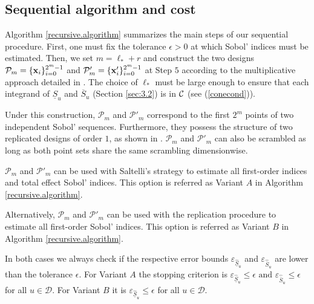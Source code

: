 \subsection{Sequential algorithm and cost}
\label{sec:4.1}

Algorithm \ref{recursive.algorithm} summarizes the main steps of our sequential procedure. First, one must fix the tolerance $\epsilon >0$ at which Sobol' indices must be estimated. Then, we set $m=\ell_*+r$ and construct the two designs $\mathcal{P}_{m}=\{\boldsymbol{\mathbf{x}}_i\}_{i=0}^{2^{m}-1}$ and $\mathcal{P}'_{m}=\{\boldsymbol{\mathbf{x}}'_i\}_{i=0}^{2^{m}-1}$ at Step $5$ according to the multiplicative approach detailed in \cite{GJAHMP}. The choice of $\ell_*$ must be large enough to ensure that each integrand of $\underline{S}_u$ and $\overline{S}_u$ (Section \ref{sec:3.2}) is in $\mathcal{C}$ (see  (\ref{conecond})).

Under this construction, $\mathcal{P}_{m}$ and $\mathcal{P}'_{m}$ correspond to the first $2^{m}$ points of two independent Sobol' sequences. Furthermore, they possess the structure of two replicated designs of order $1$, as shown in \cite{GJAHMP}. $\mathcal{P}_{m}$ and $\mathcal{P}'_{m}$ can also be scrambled as long as both point sets share the same scrambling dimensionwise.
\bigskip

$\mathcal{P}_{m}$ and $\mathcal{P}'_{m}$ can be used with Saltelli's strategy to estimate all first-order indices and total effect Sobol' indices. This option is referred as Variant $A$ in Algorithm \ref{recursive.algorithm}.

Alternatively, $\mathcal{P}_{m}$ and $\mathcal{P}'_{m}$ can be used with the replication procedure to estimate all first-order Sobol' indices. This option is referred as Variant $B$ in Algorithm \ref{recursive.algorithm}. 

In both cases we always check if the respective error bounds $\varepsilon_{\widehat{\underline{S}}_u}$ and $\varepsilon_{\widehat{\overline{S}}_u}$ are lower than the tolerance $\epsilon$. For Variant $A$ the stopping criterion is $\varepsilon_{\widehat{\underline{S}}_u} \leq \epsilon \text{ and } \varepsilon_{\widehat{\overline{S}}_u} \leq \epsilon$ for all $ u \in \mathcal{D}$. For Variant $B$ it is $\varepsilon_{\widehat{\underline{S}}_u} \leq \epsilon$ for all $ u \in \mathcal{D}$. 

